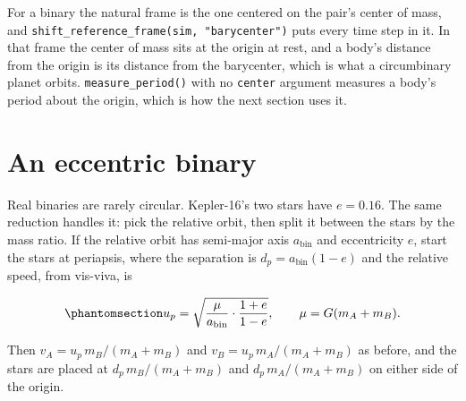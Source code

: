 \documentclass[
  10.5pt,
  letterpaper,
]{scrbook}
\theoremstyle{plain}
\theoremstyle{remark}
\begin{document}
For a binary the natural frame is the one centered on the pair's center
of mass, and \texttt{shift\_reference\_frame(sim,\ "barycenter")} puts
every time step in it. In that frame the center of mass sits at the
origin at rest, and a body's distance from the origin is its distance
from the barycenter, which is what a circumbinary planet orbits.
\texttt{measure\_period()} with no \texttt{center} argument measures a
body's period about the origin, which is how the next section uses it.

\section{An eccentric binary}\label{an-eccentric-binary}

Real binaries are rarely circular. Kepler-16's two stars have
\(e = 0.16\). The same reduction handles it: pick the relative orbit,
then split it between the stars by the mass ratio. If the relative orbit
has semi-major axis \(a_{\mathrm{bin}}\) and eccentricity \(e\), start
the stars at periapsis, where the separation is
\(d_p = a_{\mathrm{bin}}(1-e)\) and the relative speed, from vis-viva,
is

\begin{equation}\protect\phantomsection\label{eq-binary-periapsis}{
u_p = \sqrt{\frac{\mu}{a_{\mathrm{bin}}}\cdot\frac{1+e}{1-e}}, \qquad \mu = G(m_A+m_B).
}\end{equation}

Then \(v_A = u_p\,m_B/(m_A+m_B)\) and \(v_B = u_p\,m_A/(m_A+m_B)\) as
before, and the stars are placed at \(d_p\,m_B/(m_A+m_B)\) and
\(d_p\,m_A/(m_A+m_B)\) on either side of the origin.
\end{document}
